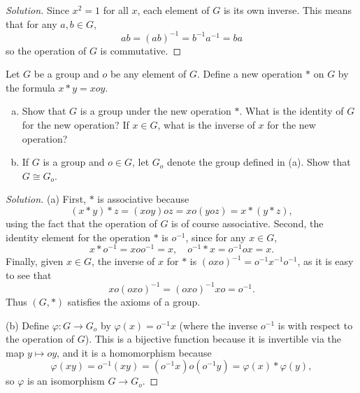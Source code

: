 \documentclass[11pt]{scrartcl}
\providecommand{\ii}{\item}
\providecommand{\inv}{^{-1}}
\newenvironment{soln}{\begin{proof}[Solution]}{\end{proof}}
\begin{document}
\begin{soln}
    Since $x^2 = 1$ for all $x$, each element of $G$ is its own inverse.
    This means that for any $a,b\in G$,
    \begin{equation*}
	ab = (ab)\inv = b\inv a\inv = ba
    \end{equation*}
    so the operation of $G$ is commutative.
\end{soln}

\pagebreak

\begin{problem}
    Let $G$ be a group and $o$ be any element of $G$.
    Define a new operation $*$ on $G$ by the formula $x*y = xoy$.
    \begin{enumerate}[(a)]
        \ii Show that $G$ is a group under the new operation $*$.
	What is the identity of $G$ for the new operation?
	If $x\in G$, what is the inverse of $x$ for the new operation?
	\ii If $G$ is a group and $o\in G$,
	let $G_o$ denote the group defined in (a).
	Show that $G\cong G_o$.
    \end{enumerate}
\end{problem}

\begin{soln}
    (a) First, $*$ is associative because
    \begin{equation*}
	(x*y)*z = (xoy)oz = xo(yoz) = x*(y*z),
    \end{equation*}
    using the fact that the operation of $G$ is of course associative.
    Second, the identity element for the operation $*$ is $o\inv$,
    since for any $x\in G$,
    \begin{equation*}
        x*o\inv = xoo\inv = x,\quad o\inv*x = o\inv ox = x.
    \end{equation*}
    Finally, given $x\in G$, the inverse of $x$ for $*$ is
    $(oxo)\inv = o\inv x\inv o\inv$, as it is easy to see that
    \begin{equation*}
        xo(oxo)\inv = (oxo)\inv xo = o\inv.
    \end{equation*}
    Thus $(G,*)$ satisfies the axioms of a group.

    (b) Define $\varphi\colon G\to G_o$ by $\varphi(x) = o\inv x$
    (where the inverse $o\inv$ is with respect to the operation of $G$).
    This is a bijective function because it is invertible via the map
    $y\mapsto oy$, and it is a homomorphism because
    \begin{equation*}
        \varphi(xy) = o\inv (xy) = (o\inv x)o(o\inv y) =
	\varphi(x)*\varphi(y),
    \end{equation*}
    so $\varphi$ is an isomorphism $G\to G_o$.
\end{soln}
\end{document}
